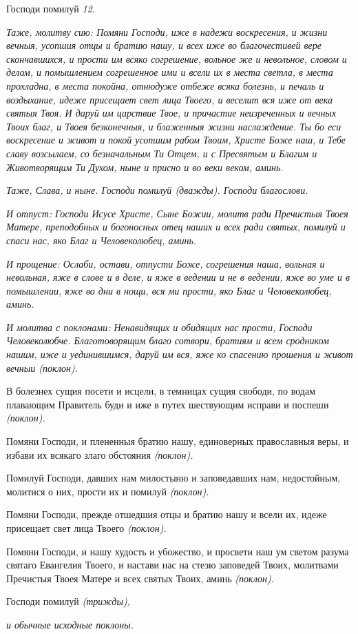    Господи помилуй \itshape 12\normalfont{}.



 \itshape Таже, молитву сию:\normalfont{} Помяни Господи, иже в надежи воскресения, и
жизни вечныя, усопшия отцы и братию нашу, и всех иже во благочестивей
вере скончавшихся, и прости им всяко согрешение, вольное же и
невольное, словом и делом, и помышлением согрешенное ими и всели
их в места светла, в места прохладна, в места покойна, отнюдуже
отбеже всяка болезнь, и печаль и воздыхание, идеже присещает свет
лица Твоего, и веселит вся иже от века святыя Твоя. И даруй им
царствие Твое, и причастие неизреченных и вечных Твоих благ, и
Твоея безконечныя, и блаженныя жизни наслаждение. Ты бо еси
воскресение и живот и покой усопшим рабом Твоим, Христе Боже наш, и
Тебе славу возсылаем, со безначальным Ти Отцем, и с Пресвятым и
Благим и Животворящим Ти Духом, ныне и присно и во веки веком,
аминь.


 \itshape Таже,\normalfont{} \itshape Слава, и ныне\normalfont{}. Господи помилуй \itshape (дважды)\normalfont{}. Господи благослови.


 \itshape И отпуст:\normalfont{} Господи Исусе Христе, Сыне Божии, молитв ради Пречистыя
Твоея Матере, преподобных и богоносных отец наших и всех ради святых,
помилуй и спаси нас, яко Благ и Человеколюбец, аминь.


 \itshape И прощение:\normalfont{} Ослаби, остави, отпусти Боже, согрешения наша, вольная и
невольная, яже в слове и в деле, и яже в ведении и не в ведении, яже во
уме и в помышлении, яже во дни в нощи, вся ми прости, яко Благ и
Человеколюбец, аминь.


 \itshape И молитва с поклонами:\normalfont{} Ненавидящих и обидящих нас прости, Господи
Человеколюбче. Благотоворящим благо сотвори, братиям и всем сродником
нашим, иже и уединившимся, даруй им вся, яже ко спасению прошения и
живот вечныи \itshape (поклон)\normalfont{}.


   В болезнех сущия посети и исцели, в темницах сущия свободи, по водам
плавающим Правитель буди и иже в путех шествующим исправи и поспеши
\itshape (поклон)\normalfont{}.


   Помяни Господи, и плененныя братию нашу, единоверных православныя
веры, и избави их всякаго злаго обстояния \itshape (поклон)\normalfont{}.


   Помилуй Господи, давших нам милостыню и заповедавших нам,
недостойным, молитися о них, прости их и помилуй \itshape (поклон)\normalfont{}.


   Помяни Господи, прежде отшедшия отцы и братию нашу и всели их,
идеже присещает свет лица Твоего \itshape (поклон)\normalfont{}.


   Помяни Господи, и нашу худость и убожество, и просвети наш ум светом
разума святаго Евангелия Твоего, и настави нас на стезю заповедей Твоих,
молитвами Пречистыя Твоея Матере и всех святых Твоих, аминь
\itshape (поклон)\normalfont{}.


   Господи помилуй \itshape (трижды)\normalfont{},


 \itshape и обычные исходные поклоны.\normalfont{}


\mychapterending